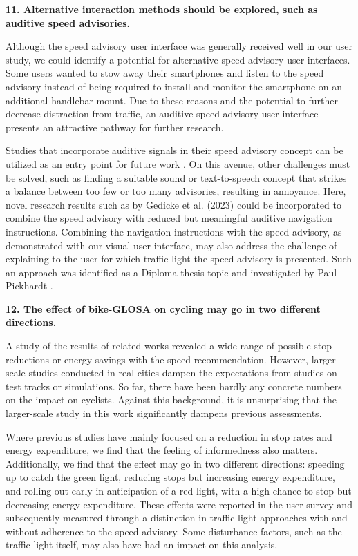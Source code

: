 \textbf{\color{cidarkblue}11. Alternative interaction methods should be explored, such as auditive speed advisories.} 

Although the speed advisory user interface was generally received well in our user study, we could identify a potential for alternative speed advisory user interfaces. Some users wanted to stow away their smartphones and listen to the speed advisory instead of being required to install and monitor the smartphone on an additional handlebar mount. Due to these reasons and the potential to further decrease distraction from traffic, an auditive speed advisory user interface presents an attractive pathway for further research. 

Studies that incorporate auditive signals in their speed advisory concept can be utilized as an entry point for future work \cite{suramardhana_driver-centric_2014, xu_bb_2015, wilson_driver_2017, sokolov_effects_2018, zhang_green_2020, chen_developing_2022}. On this avenue, other challenges must be solved, such as finding a suitable sound or text-to-speech concept that strikes a balance between too few or too many advisories, resulting in annoyance. Here, novel research results such as by Gedicke et al. (2023) \cite{gedicke_selecting_2023} could be incorporated to combine the speed advisory with reduced but meaningful auditive navigation instructions. Combining the navigation instructions with the speed advisory, as demonstrated with our visual user interface, may also address the challenge of explaining to the user for which traffic light the speed advisory is presented. Such an approach was identified as a Diploma thesis topic and investigated by Paul Pickhardt \cite{pickhardt_2023}.

\textbf{\color{cidarkblue}12. The effect of bike-GLOSA on cycling may go in two different directions.} 

A study of the results of related works revealed a wide range of possible stop reductions or energy savings with the speed recommendation. However, larger-scale studies conducted in real cities dampen the expectations from studies on test tracks or simulations. So far, there have been hardly any concrete numbers on the impact on cyclists. Against this background, it is unsurprising that the larger-scale study in this work significantly dampens previous assessments. 

Where previous studies have mainly focused on a reduction in stop rates and energy expenditure, we find that the feeling of informedness also matters. Additionally, we find that the effect may go in two different directions: speeding up to catch the green light, reducing stops but increasing energy expenditure, and rolling out early in anticipation of a red light, with a high chance to stop but decreasing energy expenditure. These effects were reported in the user survey and subsequently measured through a distinction in traffic light approaches with and without adherence to the speed advisory. Some disturbance factors, such as the traffic light itself, may also have had an impact on this analysis.

